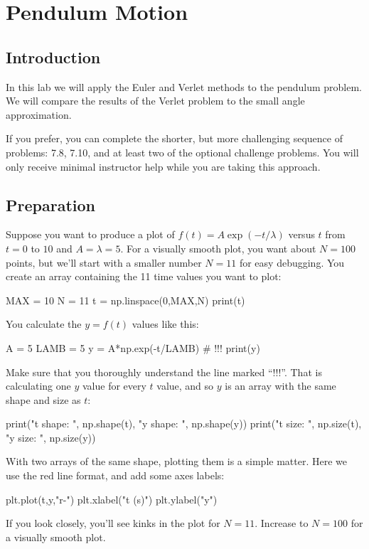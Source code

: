 \chapter{Pendulum Motion}

\section{Introduction}

In this lab we will apply the Euler and Verlet methods to the pendulum
problem.  We will compare the results of the Verlet problem to the
small angle approximation.

If you prefer, you can complete the shorter, but more challenging
sequence of problems: 7.8, 7.10, and at least two of the optional
challenge problems.  You will only receive minimal instructor help
while you are taking this approach.

\section{Preparation}

Suppose you want to produce a plot of $f(t) = A \exp(-t/\lambda)$
versus $t$ from $t=0$ to $10$ and $A=\lambda=5$.  For a visually
smooth plot, you want about $N=100$ points, but we'll start with a
smaller number $N=11$ for easy debugging.  You create an array containing the 11
time values you want to plot:
\begin{python}
MAX = 10
N = 11
t = np.linspace(0,MAX,N)
print(t)
\end{python}
You calculate the $y = f(t)$ values like this:
\begin{python}
A    = 5
LAMB = 5
y = A*np.exp(-t/LAMB)  # !!!
print(y)
\end{python}
Make sure that you thoroughly understand the line marked ``!!!''.  That is
calculating one $y$ value for every $t$ value, and so $y$ is an array
with the same shape and size as $t$:
\begin{python}
print("t shape: ", np.shape(t), "y shape: ", np.shape(y))
print("t size:  ", np.size(t),  "y size: ", np.size(y))
\end{python}
With two arrays of the same shape, plotting them is a simple matter.  Here we use the red line format, and add some axes labels:
\begin{python}
plt.plot(t,y,"r-")
plt.xlabel("t (s)")
plt.ylabel("y")
\end{python}
If you look closely, you'll see kinks in the plot for $N=11$.  Increase to $N=100$ for a visually smooth plot.

